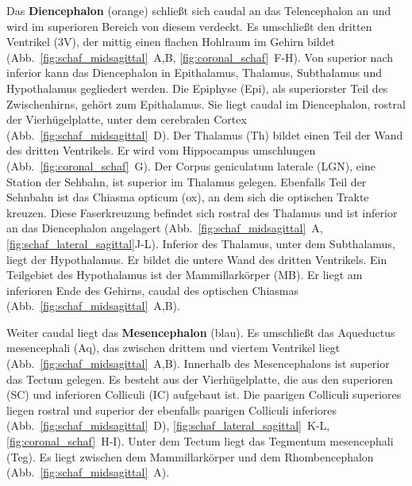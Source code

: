 \documentclass[12pt,a4paper,pdftex]{article}
\begin{document}
\noindent Das \textbf{Diencephalon} (orange) schließt sich caudal an das Telencephalon an und wird im superioren Bereich von diesem verdeckt. Es umschließt den dritten Ventrikel (3V), der mittig einen flachen Hohlraum im Gehirn bildet (Abb.~\ref{fig:schaf_midsagittal}~A,B, \ref{fig:coronal_schaf}~F-H). Von superior nach inferior kann das Diencephalon in Epithalamus, Thalamus, Subthalamus und Hypothalamus gegliedert werden. Die Epiphyse (Epi), als superiorster Teil des Zwischenhirns, gehört zum Epithalamus. Sie liegt caudal im Diencephalon, rostral der Vierhügelplatte, unter dem cerebralen Cortex (Abb.~\ref{fig:schaf_midsagittal}~D). Der Thalamus (Th) bildet einen Teil der Wand des dritten Ventrikels. Er wird vom Hippocampus umschlungen (Abb.~\ref{fig:coronal_schaf}~G). Der Corpus geniculatum laterale (LGN), eine Station der Sehbahn, ist superior im Thalamus gelegen. Ebenfalls Teil der Sehnbahn ist das Chiasma opticum (ox), an dem sich die optischen Trakte kreuzen. Diese Faserkreuzung befindet sich rostral des Thalamus und ist inferior an das Diencephalon angelagert (Abb.~\ref{fig:schaf_midsagittal}~A, \ref{fig:schaf_lateral_sagittal}J-L). Inferior des Thalamus, unter dem Subthalamus, liegt der Hypothalamus. Er bildet die untere Wand des dritten Ventrikels. Ein Teilgebiet des Hypothalamus ist der Mammillarkörper (MB). Er liegt am inferioren Ende des Gehirns, caudal des optischen Chiasmas (Abb.~\ref{fig:schaf_midsagittal}~A,B).

\noindent Weiter caudal liegt das \textbf{Mesencephalon} (blau). Es umschließt das Aqueductus mesencephali (Aq), das zwischen drittem und viertem Ventrikel liegt (Abb.~\ref{fig:schaf_midsagittal}~A,B). Innerhalb des Mesencephalons ist superior das Tectum gelegen. Es besteht aus der Vierhügelplatte, die aus den superioren (SC) und inferioren Colliculi (IC) aufgebaut ist. Die paarigen Colliculi superiores liegen rostral und superior der ebenfalls paarigen Colliculi inferiores (Abb.~\ref{fig:schaf_midsagittal}~D), \ref{fig:schaf_lateral_sagittal}~K-L, \ref{fig:coronal_schaf}~H-I). Unter dem Tectum liegt das Tegmentum mesencephali (Teg). Es liegt zwischen dem Mammillarkörper und dem Rhombencephalon (Abb.~\ref{fig:schaf_midsagittal}~A).
\end{document}
